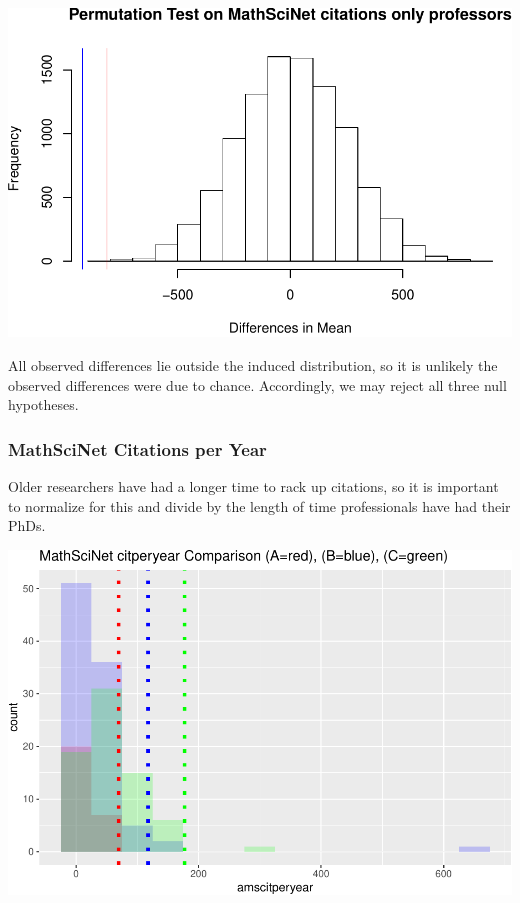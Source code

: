 \documentclass[]{article}
\begin{document}
\includegraphics{final_files/figure-latex/unnamed-chunk-31-1.pdf}

All observed differences lie outside the induced distribution, so it is
unlikely the observed differences were due to chance. Accordingly, we
may reject all three null hypotheses.

\hypertarget{mathscinet-citations-per-year}{%
\subsubsection{MathSciNet Citations per
Year}\label{mathscinet-citations-per-year}}

Older researchers have had a longer time to rack up citations, so it is
important to normalize for this and divide by the length of time
professionals have had their PhDs.

\includegraphics{final_files/figure-latex/unnamed-chunk-33-1.pdf}
\end{document}
